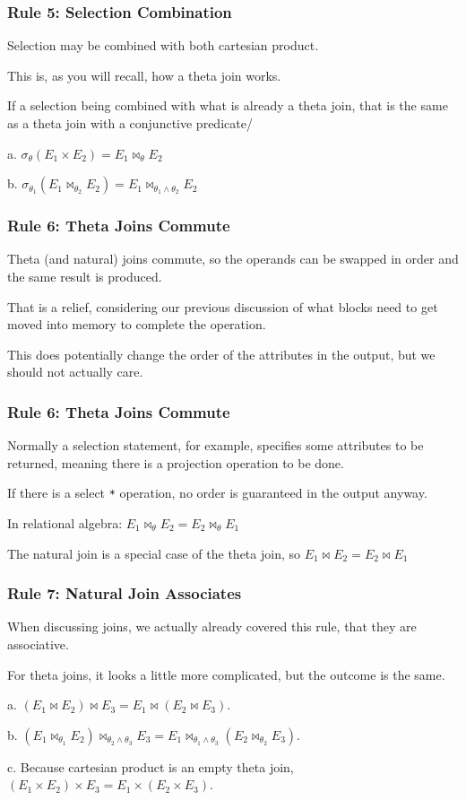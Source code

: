 \begin{frame}
\frametitle{Rule 5: Selection Combination}

Selection may be combined with both cartesian product. 

This is, as you will recall, how a theta join works.

If a selection being combined with what is already a theta join, that is the same as a theta join with a conjunctive predicate/

a. $\sigma_{\theta}(E_{1} \times E_{2}) = E_{1} \bowtie_{\theta} E_{2}$

b. $\sigma_{\theta_{1}}( E_{1} \bowtie_{\theta_{2}} E_{2}) = E_{1} \bowtie_{\theta_{1}\wedge\theta_{2}} E_{2}$

\end{frame}

\begin{frame}
\frametitle{Rule 6: Theta Joins Commute}

Theta (and natural) joins commute, so the operands can be swapped in order and the same result is produced. 

That is a relief, considering our previous discussion of what blocks need to get moved into memory to complete the operation. 

This does potentially change the order of the attributes in the output, but we should not actually care.

\end{frame}


\begin{frame}
\frametitle{Rule 6: Theta Joins Commute}

Normally a selection statement, for example, specifies some attributes to be returned, meaning there is a projection operation to be done. 

If there is a select \texttt{*} operation, no order is guaranteed in the output anyway.

In relational algebra: $E_{1} \bowtie_{\theta} E_{2} = E_{2} \bowtie_{\theta} E_{1}$

The natural join is a special case of the theta join, so $E_{1} \bowtie E_{2} = E_{2} \bowtie E_{1}$

\end{frame}

\begin{frame}
\frametitle{Rule 7: Natural Join Associates}

When discussing joins, we actually already covered this rule, that they are associative. 

For theta joins, it looks a little more complicated, but the outcome is the same.


a. $(E_{1} \bowtie E_{2}) \bowtie E_{3} = E_{1} \bowtie (E_{2} \bowtie E_{3})$. 

b. $(E_{1} \bowtie_{\theta_{1}} E_{2}) \bowtie_{\theta_{2}\wedge\theta_{3}} E_{3} = E_{1} \bowtie_{\theta_{1}\wedge\theta_{3}} (E_{2} \bowtie_{\theta_{2}} E_{3})$. 

c. Because cartesian product is an empty theta join, $(E_{1} \times E_{2}) \times E_{3} = E_{1} \times (E_{2} \times E_{3})$. 

\end{frame}


